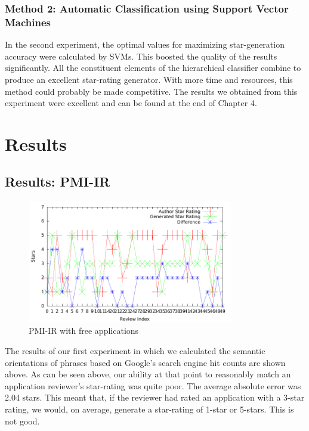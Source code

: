 \documentclass[11pt]{report} %
\begin{document}
	\subsection{Method 2: Automatic Classification using Support Vector Machines}

In the second experiment, the optimal values for maximizing star-generation accuracy were calculated by SVMs. This boosted the quality of the results significantly. All the constituent elements of the hierarchical classifier combine to produce an excellent star-rating generator. With more time and resources, this method could probably be made competitive. The results we obtained from this experiment were excellent and can be found at the end of Chapter 4.



\chapter{Results}
\label{chapter:results}
	\section{Results: PMI-IR}

	\begin{figure}[H]
	\centering
	\includegraphics[width=0.8\textwidth]{data/pmi-free.pdf}
	\caption{PMI-IR with free applications}
	\label{fig:pmi-free}
	\end{figure}

The results of our first experiment in which we calculated the semantic orientations of phrases based on Google's search engine hit counts are shown above. As can be seen above, our ability at that point to reasonably match an application reviewer's star-rating was quite poor. The average absolute error was 2.04 stars. This meant that, if the reviewer had rated an application with a 3-star rating, we would, on average, generate a star-rating of 1-star or 5-stars. This is not good.
\end{document}

